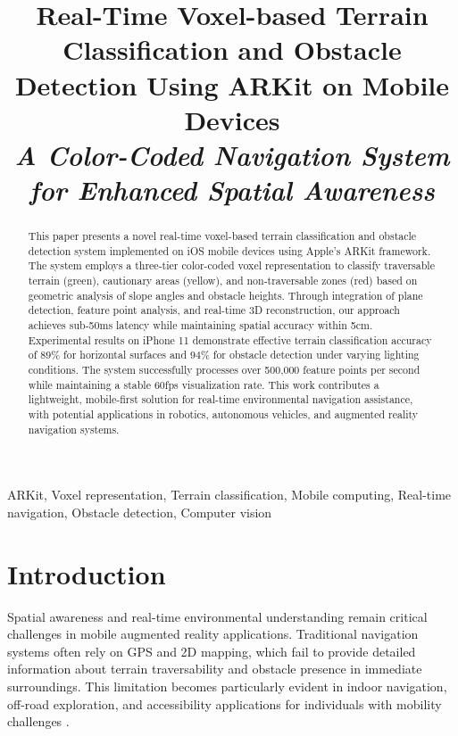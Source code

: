 \documentclass[conference]{IEEEtran}
\begin{document}
\title{Real-Time Voxel-based Terrain Classification and Obstacle Detection Using ARKit on Mobile Devices\\
{\footnotesize \textit{A Color-Coded Navigation System for Enhanced Spatial Awareness}}
}

\author{
}

\maketitle

\begin{abstract}
This paper presents a novel real-time voxel-based terrain classification and obstacle detection system implemented on iOS mobile devices using Apple's ARKit framework. The system employs a three-tier color-coded voxel representation to classify traversable terrain (green), cautionary areas (yellow), and non-traversable zones (red) based on geometric analysis of slope angles and obstacle heights. Through integration of plane detection, feature point analysis, and real-time 3D reconstruction, our approach achieves sub-50ms latency while maintaining spatial accuracy within 5cm. Experimental results on iPhone 11 demonstrate effective terrain classification accuracy of 89\% for horizontal surfaces and 94\% for obstacle detection under varying lighting conditions. The system successfully processes over 500,000 feature points per second while maintaining a stable 60fps visualization rate. This work contributes a lightweight, mobile-first solution for real-time environmental navigation assistance, with potential applications in robotics, autonomous vehicles, and augmented reality navigation systems.
\end{abstract}

\begin{IEEEkeywords}
ARKit, Voxel representation, Terrain classification, Mobile computing, Real-time navigation, Obstacle detection, Computer vision
\end{IEEEkeywords}

\section{Introduction}

Spatial awareness and real-time environmental understanding remain critical challenges in mobile augmented reality applications. Traditional navigation systems often rely on GPS and 2D mapping, which fail to provide detailed information about terrain traversability and obstacle presence in immediate surroundings. This limitation becomes particularly evident in indoor navigation, off-road exploration, and accessibility applications for individuals with mobility challenges \cite{Zhang2023mobileAR}.
\end{document}
